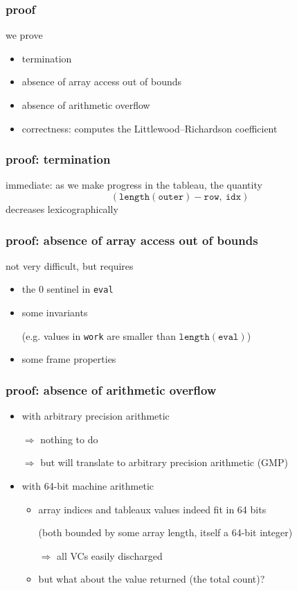 \documentclass{beamer}
\begin{document}
\begin{frame}\frametitle{proof}
  we prove
  \begin{itemize}
  \item termination
  \item absence of array access out of bounds
  \item absence of arithmetic overflow
  \item correctness: computes the Littlewood–Richardson coefficient
  \end{itemize}
\end{frame}

\begin{frame}\frametitle{proof: termination}
  immediate: as we make progress in the tableau, the quantity
  \begin{displaymath}
    (\mathtt{length}(\mathtt{outer}) - \mathtt{row}, ~ \mathtt{idx})
  \end{displaymath}
  decreases lexicographically
\end{frame}

\begin{frame}\frametitle{proof: absence of array access out of bounds}
  not very difficult, but requires
  \begin{itemize}
  \item the 0 sentinel in \texttt{eval} \par
  \item some invariants \par (e.g. values in \texttt{work} are smaller than
    $\mathtt{length}(\mathtt{eval})$)
  \item some frame properties
  \end{itemize}
\end{frame}

\begin{frame}\frametitle{proof: absence of arithmetic overflow}
  \begin{itemize}
  \item with arbitrary precision arithmetic \par
    $\Rightarrow$ nothing to do \par
    $\Rightarrow$ but will translate to arbitrary precision arithmetic (GMP)

  \bigskip
  \item with 64-bit machine arithmetic
    \begin{itemize}
    \item array indices and tableaux values indeed fit in 64 bits \par
      (both bounded by some array length, itself a 64-bit
      integer) \par
      $\Rightarrow$ all VCs easily discharged
    \item but what about the value returned (the total count)?
    \end{itemize}
  \end{itemize}
\end{frame}
\end{document}
